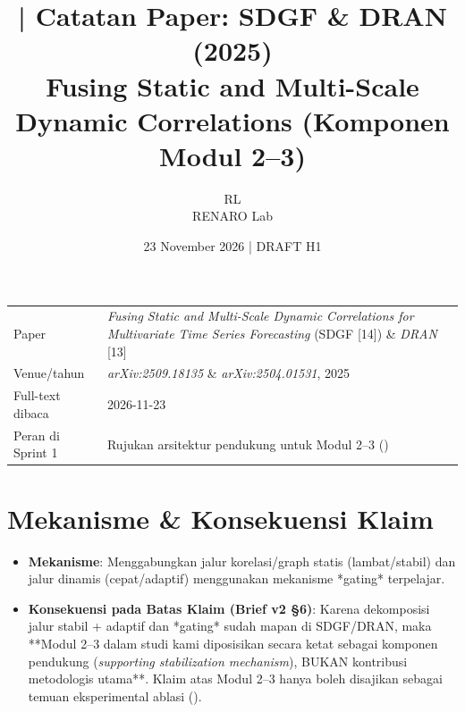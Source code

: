 \documentclass[11pt,a4paper]{article}
\title{\jobid{RL-H1-02} | Catatan Paper: SDGF \& DRAN (2025)\\
\large Fusing Static and Multi-Scale Dynamic Correlations (Komponen Modul 2--3)}
\author{RL \\ \small RENARO Lab}
\date{23 November 2026 \quad | \quad \textcolor{blue!65!black}{DRAFT H1}}
\begin{document}
\maketitle

\begin{table}[H]
\centering
\small
\begin{tabular}{@{}L{3.4cm}L{11.2cm}@{}}
\toprule
Paper & \emph{Fusing Static and Multi-Scale Dynamic Correlations for Multivariate Time Series Forecasting} (SDGF [14]) \& \emph{DRAN} [13] \\
Venue/tahun & \emph{arXiv:2509.18135} \& \emph{arXiv:2504.01531}, 2025 \\
Full-text dibaca & 2026-11-23 \\
Peran di Sprint 1 & Rujukan arsitektur pendukung untuk Modul 2--3 () \\
\bottomrule
\end{tabular}
\end{table}

\section{Mekanisme \& Konsekuensi Klaim}
\begin{itemize}
  \item \textbf{Mekanisme}: Menggabungkan jalur korelasi/graph statis (lambat/stabil) dan jalur dinamis (cepat/adaptif) menggunakan mekanisme *gating* terpelajar.
  \item \textbf{Konsekuensi pada Batas Klaim (Brief v2 \S6)}: Karena dekomposisi jalur stabil + adaptif dan *gating* sudah mapan di SDGF/DRAN, maka **Modul 2--3 dalam studi kami diposisikan secara ketat sebagai komponen pendukung (\emph{supporting stabilization mechanism}), BUKAN kontribusi metodologis utama**. Klaim atas Modul 2--3 hanya boleh disajikan sebagai temuan eksperimental ablasi ().
\end{itemize}
\end{document}
